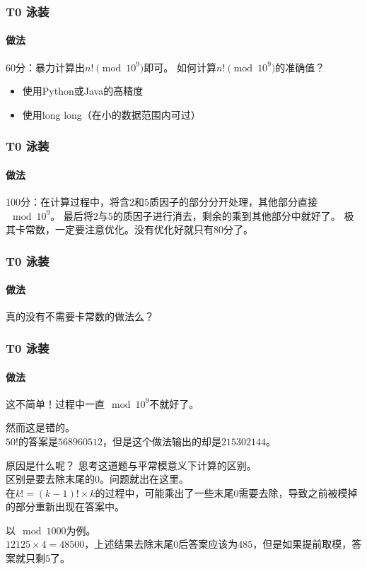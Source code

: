 \documentclass[utf8]{beamer}
\begin{document}
\begin{frame}
    \frametitle{T0 泳装}
    \framesubtitle{做法}
    60分：暴力计算出$n!\pmod{10^9}$即可。\newline
    \pause
    如何计算$n!\pmod{10^{9}}$的准确值？
    \begin{itemize}
        \item 使用Python或Java的高精度
        \pause
        \item 使用long long（在小的数据范围内可过）
    \end{itemize}
\end{frame}
\begin{frame}
    \frametitle{T0 泳装}
    \framesubtitle{做法}
    100分：在计算过程中，将含$2$和$5$质因子的部分分开处理，其他部分直接$\mod{10^9}$。\newline
    最后将$2$与$5$的质因子进行消去，剩余的乘到其他部分中就好了。\newline
    \pause
    极其卡常数，一定要注意优化。没有优化好就只有80分了。
\end{frame}
\begin{frame}
    \frametitle{T0 泳装}
    \framesubtitle{做法}
    \pause
    \newline
    真的没有不需要卡常数的做法么？
\end{frame}
\begin{frame}
    \frametitle{T0 泳装}
    \framesubtitle{做法}
    这不简单！过程中一直$\mod{10^9}$不就好了。\newline
    
    \pause
    然而这是错的。\\
    $50!$的答案是$568960512$，但是这个做法输出的却是$215302144$。\newline

    \pause
    原因是什么呢？
    \pause
    思考这道题与平常模意义下计算的区别。\\
    区别是要去除末尾的$0$。问题就出在这里。\\
    在$k!=(k-1)!\times k$的过程中，可能乘出了一些末尾$0$需要去除，导致之前被模掉的部分重新出现在答案中。\newline

    \pause
    以$\mod{1000}$为例。\\
    $12125\times 4=48500$，上述结果去除末尾$0$后答案应该为$485$，但是如果提前取模，答案就只剩$5$了。
\end{frame}
\end{document}
